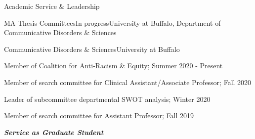 \documentclass{resume} %
\begin{document}
\begin{rSection}{Academic Service \& Leadership}
\begin{rSubsection}{MA Thesis Committees}{In progress}{University at Buffalo, Department of Communicative Disorders \& Sciences}{}


\begin{rSubsection}{Communicative Disorders \& Sciences}{}{University at Buffalo}{}
	\item Member of Coalition for Anti-Racism \& Equity; Summer 2020 - Present
	\item Member of search committee for Clinical Assistant/Associate Professor; Fall 2020
	\item Leader of subcommittee departmental SWOT analysis; Winter 2020
	\item Member of search committee for Assistant Professor; Fall 2019
\end{rSubsection}

%	
%
%
%	

\bigskip
\begin{center}
	{\bf \emph{Service as Graduate Student}}\\
\end{center}


\end{rSubsection}
\end{rSection}
\end{document}
